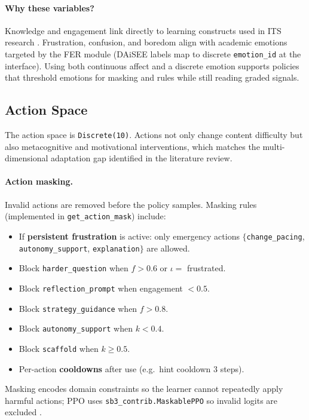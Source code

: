 \paragraph{Why these variables?}
Knowledge and engagement link directly to learning constructs used in ITS research \cite{zerkouk_comprehensive_2025,guzman_developing_2025,dmello_language_2012}. Frustration, confusion, and boredom align with academic emotions targeted by the FER module (DAiSEE labels map to discrete \texttt{emotion\_id} at the interface). Using both continuous affect and a discrete emotion supports policies that threshold emotions for masking and rules while still reading graded signals.

\subsection{Action Space}\label{sec:method_action_space}

The action space is \texttt{Discrete(10)}. Actions not only change content difficulty but also metacognitive and motivational interventions, which matches the multi-dimensional adaptation gap identified in the literature review.

\paragraph{Action masking.}
Invalid actions are removed before the policy samples. Masking rules (implemented in \texttt{get\_action\_mask}) include:
\begin{itemize}
    \item If \textbf{persistent frustration} is active: only emergency actions $\{$\texttt{change\_pacing}, \texttt{autonomy\_support}, \texttt{explanation}$\}$ are allowed.
    \item Block \texttt{harder\_question} when $f > 0.6$ or $\iota =$ frustrated.
    \item Block \texttt{reflection\_prompt} when engagement $< 0.5$.
    \item Block \texttt{strategy\_guidance} when $f > 0.8$.
    \item Block \texttt{autonomy\_support} when $k < 0.4$.
    \item Block \texttt{scaffold} when $k \geq 0.5$.
    \item Per-action \textbf{cooldowns} after use (e.g.\ hint cooldown $3$ steps).
\end{itemize}
Masking encodes domain constraints so the learner cannot repeatedly apply harmful actions; PPO uses \texttt{sb3\_contrib.MaskablePPO} so invalid logits are excluded \cite{schulman_ppo_2017,guzman_developing_2025}.

